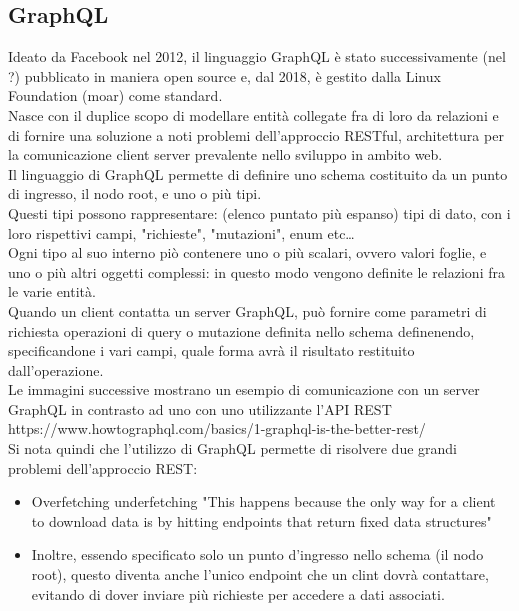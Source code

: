 \documentclass[a4paper, 12pt]{scrartcl}
\begin{document}
    \subsection*{GraphQL}
      Ideato da Facebook nel 2012, il linguaggio GraphQL è stato successivamente (nel ?) pubblicato in maniera open source e, dal 2018, è gestito dalla Linux Foundation (moar) come standard.\\
      Nasce con il duplice scopo di modellare entità collegate fra di loro da relazioni e di fornire una soluzione a noti problemi dell'approccio RESTful, architettura per la comunicazione client server prevalente nello sviluppo in ambito web.\\
      Il linguaggio di GraphQL permette di definire uno schema costituito da un punto di ingresso, il nodo root, e uno o più tipi.\\
      
      Questi tipi possono rappresentare: (elenco puntato più espanso) tipi di dato, con i loro rispettivi campi, "richieste", "mutazioni", enum etc\dots\\
      
      Ogni tipo al suo interno piò contenere uno o più scalari, ovvero valori foglie, e uno o più altri oggetti complessi: in questo modo vengono definite le relazioni fra le varie entità.\\

      Quando un client contatta un server GraphQL, può fornire come parametri di richiesta operazioni di query o mutazione definita nello schema definenendo, specificandone i vari campi, quale forma avrà il risultato restituito dall'operazione.\\

      Le immagini successive mostrano un esempio di comunicazione con un server GraphQL in contrasto ad uno con uno utilizzante l'API REST
      https://www.howtographql.com/basics/1-graphql-is-the-better-rest/\\


      Si nota quindi che l'utilizzo di GraphQL permette di risolvere due grandi problemi dell'approccio REST:
      \begin{itemize}
        \item 
        Overfetching underfetching "This happens because the only way for a client to download data is by hitting endpoints that return fixed data structures"
        \item
        Inoltre, essendo specificato solo un punto d'ingresso nello schema (il nodo root), questo diventa anche l'unico endpoint che un clint dovrà contattare, evitando di dover inviare più richieste per accedere a dati associati. 
      \end{itemize}
      
\end{document}
